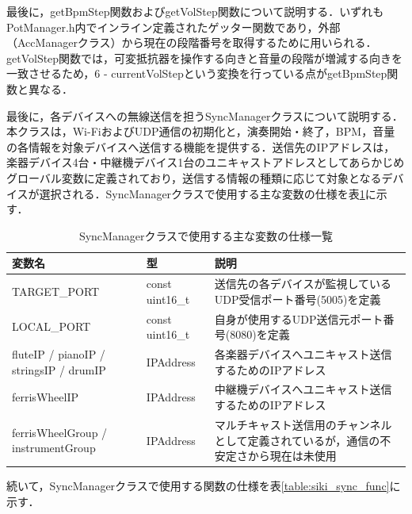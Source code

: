 最後に，getBpmStep関数およびgetVolStep関数について説明する．いずれもPotManager.h内でインライン定義されたゲッター関数であり，外部（AccManagerクラス）から現在の段階番号を取得するために用いられる．getVolStep関数では，可変抵抗器を操作する向きと音量の段階が増減する向きを一致させるため，6 - currentVolStepという変換を行っている点がgetBpmStep関数と異なる．


最後に，各デバイスへの無線送信を担うSyncManagerクラスについて説明する．本クラスは，Wi-FiおよびUDP通信の初期化と，演奏開始・終了，BPM，音量の各情報を対象デバイスへ送信する機能を提供する．送信先のIPアドレスは，楽器デバイス4台・中継機デバイス1台のユニキャストアドレスとしてあらかじめグローバル変数に定義されており，送信する情報の種類に応じて対象となるデバイスが選択される．SyncManagerクラスで使用する主な変数の仕様を表\ref{table:siki_sync_var}に示す．

\begin{table}[H]
    \caption{SyncManagerクラスで使用する主な変数の仕様一覧}
    \centering
    \label{table:siki_sync_var}
    \begin{tabular}{p{3.0cm}p{2.5cm}p{8.0cm}}
    \hline
    \textbf{変数名} & \textbf{型} & \textbf{説明}\\
    \hline
    TARGET\_PORT & const uint16\_t & 送信先の各デバイスが監視しているUDP受信ポート番号(5005)を定義\\
    \hline
    LOCAL\_PORT & const uint16\_t & 自身が使用するUDP送信元ポート番号(8080)を定義\\
    \hline
    fluteIP / pianoIP / stringsIP / drumIP & IPAddress & 各楽器デバイスへユニキャスト送信するためのIPアドレス\\
    \hline
    ferrisWheelIP & IPAddress & 中継機デバイスへユニキャスト送信するためのIPアドレス\\
    \hline
    ferrisWheelGroup / instrumentGroup & IPAddress & マルチキャスト送信用のチャンネルとして定義されているが，通信の不安定さから現在は未使用\\
    \hline
    \end{tabular}
\end{table}

続いて，SyncManagerクラスで使用する関数の仕様を表\ref{table:siki_sync_func}に示す．

